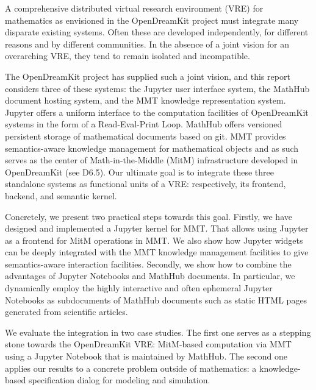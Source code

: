 A comprehensive distributed virtual research environment (VRE) for mathematics as envisioned in the OpenDreamKit project must integrate many disparate existing systems.
Often these are developed independently, for different reasons and by different communities.
In the absence of a joint vision for an overarching VRE, they tend to remain isolated and incompatible.

The OpenDreamKit project has supplied such a joint vision, and this report considers three of these systems: the Jupyter user interface system, the MathHub document hosting system, and the MMT knowledge representation system.
Jupyter offers a uniform interface to the computation facilities of OpenDreamKit systems in the form of a Read-Eval-Print Loop.
MathHub offers versioned persistent storage of mathematical documents based on git.
MMT provides semantics-aware knowledge management for mathematical objects and as such serves as the center of Math-in-the-Middle (MitM) infrastructure developed in OpenDreamKit (see D6.5).
Our ultimate goal is to integrate these three standalone systems as functional units of a VRE: respectively, its frontend, backend, and semantic kernel.

Concretely, we present two practical steps towards this goal.
Firstly, we have designed and implemented a Jupyter kernel for MMT.
That allows using Jupyter as a frontend for MitM operations in MMT.
We also show how Jupyter widgets can be deeply integrated with the MMT knowledge management facilities to give semantics-aware interaction facilities.
Secondly, we show how to combine the advantages of Jupyter Notebooks and MathHub documents.
In particular, we dynamically employ the highly interactive and often ephemeral Jupyter Notebooks as subdocuments of MathHub documents such as static HTML pages generated from scientific articles.

We evaluate the integration in two case studies.
The first one serves as a stepping stone towards the OpenDreamKit VRE: MitM-based computation via MMT using a Jupyter Notebook that is maintained by MathHub.
The second one applies our results to a concrete problem outside of mathematics: a knowledge-based specification dialog for modeling and simulation.